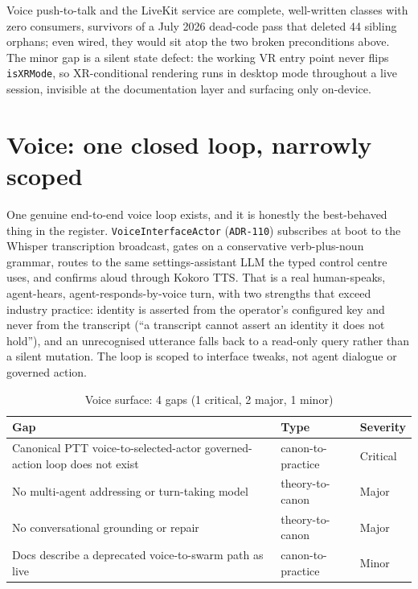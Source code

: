 Voice push-to-talk and the LiveKit service are complete, well-written classes with zero consumers, survivors of a July 2026 dead-code pass that deleted 44 sibling orphans; even wired, they would sit atop the two broken preconditions above. The minor gap is a silent state defect: the working VR entry point never flips \texttt{isXRMode}, so XR-conditional rendering runs in desktop mode throughout a live session, invisible at the documentation layer and surfacing only on-device.

\section{Voice: one closed loop, narrowly scoped}

One genuine end-to-end voice loop exists, and it is honestly the best-behaved thing in the register. \texttt{VoiceInterfaceActor} (\texttt{ADR-110}) subscribes at boot to the Whisper transcription broadcast, gates on a conservative verb-plus-noun grammar, routes to the same settings-assistant LLM the typed control centre uses, and confirms aloud through Kokoro TTS. That is a real human-speaks, agent-hears, agent-responds-by-voice turn, with two strengths that exceed industry practice: identity is asserted from the operator's configured key and never from the transcript (``a transcript cannot assert an identity it does not hold''), and an unrecognised utterance falls back to a read-only query rather than a silent mutation. The loop is scoped to interface tweaks, not agent dialogue or governed action.

\begin{table}[h]
\centering
\caption{Voice surface: 4 gaps (1 critical, 2 major, 1 minor)}
\label{tab:gaps-voice}
\begin{tabularx}{\textwidth}{X L{3.2cm} L{1.6cm}}
\toprule
\textbf{Gap} & \textbf{Type} & \textbf{Severity} \\
\midrule
Canonical PTT voice-to-selected-actor governed-action loop does not exist & canon-to-practice & Critical \\
\addlinespace
No multi-agent addressing or turn-taking model & theory-to-canon & Major \\
\addlinespace
No conversational grounding or repair & theory-to-canon & Major \\
\addlinespace
Docs describe a deprecated voice-to-swarm path as live & canon-to-practice & Minor \\
\bottomrule
\end{tabularx}
\end{table}

